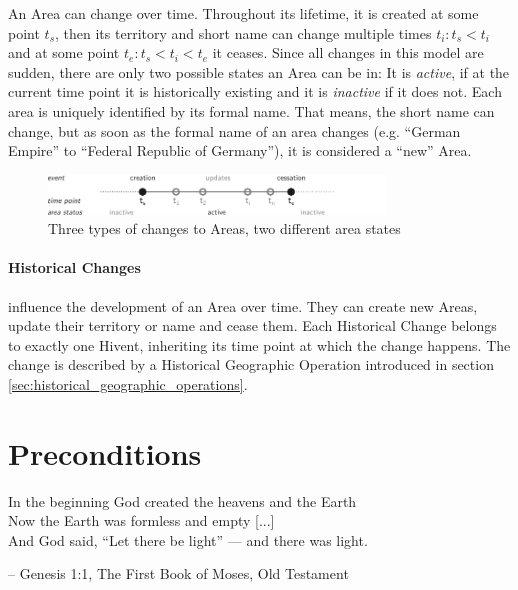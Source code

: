 An Area can change over time. Throughout its lifetime, it is created at some point $t_s$, then its territory and short name can change multiple times $t_i: t_s < t_i$ and at some point $t_e: t_s < t_i < t_e$ it ceases. Since all changes in this model are sudden, there are only two possible states an Area can be in: It is \emph{active}, if at the current time point it is historically existing and it is \emph{inactive} if it does not. Each area is uniquely identified by its formal name. That means, the short name can change, but as soon as the formal name of an area changes (e.g. ``German Empire'' to ``Federal Republic of Germany''), it is considered a ``new'' Area.

\begin{figure}[H]
  \centering
  \includegraphics[width=0.8\textwidth]{graphics/hivent_model/area_states}
  \caption{Three types of changes to Areas, two different area states}
  \label{fig:area_states}
\end{figure}


\paragraph{Historical Changes} %
\label{par:historical_changes}

influence the development of an Area over time. They can create new Areas, update their territory or name and cease them. Each Historical Change belongs to exactly one Hivent, inheriting its time point at which the change happens.  The change is described by a Historical Geographic Operation introduced in section \ref{sec:historical_geographic_operations}.


\section{Preconditions} %
\label{sec:preconditions}

\begin{quoteit}
In the beginning God created the heavens and the Earth \\
Now the Earth was formless and empty [...] \\
And God said, “Let there be light” --- and there was light.
\end{quoteit}
\hfill -- Genesis 1:1, The First Book of Moses, Old Testament

